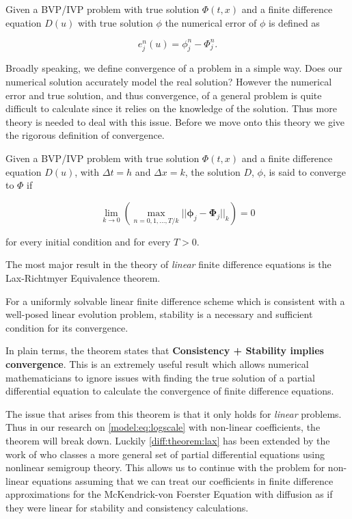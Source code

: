 \documentclass[../main.tex]{subfiles}
\begin{document}
  \begin{definition}
    Given a BVP/IVP problem with true solution $\Phi(t, x)$ and a finite difference equation $D(u)$ with true solution $\phi$ the numerical error of $\phi$ is defined as

    \begin{equation}
      e^n_j(u) = \phi^n_j - \Phi^n_j.
    \end{equation}
  \end{definition}

  Broadly speaking, we define convergence of a problem in a simple way. Does our numerical solution accurately model the real solution? However the numerical error and true solution, and thus convergence, of a general problem is quite difficult to calculate since it relies on the knowledge of the solution. Thus more theory is needed to deal with this issue. Before we move onto this theory we give the rigorous definition of convergence.

  \begin{definition}[Convergence]
    Given a BVP/IVP problem with true solution $\Phi(t, x)$ and a finite difference equation $D(u)$, with $\Delta t = h$ and $\Delta x = k$, the solution $D$, $\phi$, is said to converge to $\Phi$ if

    \begin{equation}
      \lim_{k \to 0} \left( \max_{n = 0, 1, ..., T / k} || \boldsymbol\phi_j - \boldsymbol\Phi_j ||_k \right) = 0
    \end{equation}

    for every initial condition and for every $T > 0$.
  \end{definition}

  The most major result in the theory of \emph{linear} finite difference equations is the  Lax-Richtmyer Equivalence theorem.

  \begin{theorem}\label{diff:theorem:lax}
    For a uniformly solvable linear finite difference scheme which is consistent with a well-posed linear evolution problem, stability is a necessary and sufficient condition for its convergence.
  \end{theorem}

  In plain terms, the theorem states that \textbf{Consistency + Stability implies convergence}. This is an extremely useful result which allows numerical mathematicians to ignore issues with finding the true solution of a partial differential equation to calculate the convergence of finite difference equations.

  The issue that arises from this theorem is that it only holds for \emph{linear} problems. Thus in our research on \autoref{model:eq:logscale} with non-linear coefficients, the theorem will break down. Luckily \autoref{diff:theorem:lax} has been extended by the work of \cite{rosinger2008} who classes a more general set of partial differential equations using nonlinear semigroup theory. This allows us to continue with the problem for non-linear equations assuming that we can treat our coefficients in finite difference approximations for the McKendrick-von Foerster Equation with diffusion as if they were linear for stability and consistency calculations.
\end{document}
